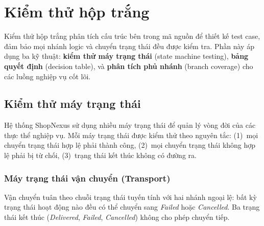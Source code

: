 
\section{Kiểm thử hộp trắng}
\label{sec:whitebox-testing}

Kiểm thử hộp trắng phân tích cấu trúc bên trong mã nguồn để thiết kế test case, đảm bảo mọi nhánh logic và chuyển trạng thái đều được kiểm tra. Phần này áp dụng ba kỹ thuật: \textbf{kiểm thử máy trạng thái} (state machine testing), \textbf{bảng quyết định} (decision table), và \textbf{phân tích phủ nhánh} (branch coverage) cho các luồng nghiệp vụ cốt lõi.

\subsection{Kiểm thử máy trạng thái}
\label{subsec:state-machine-testing}

Hệ thống ShopNexus sử dụng nhiều máy trạng thái để quản lý vòng đời của các thực thể nghiệp vụ. Mỗi máy trạng thái được kiểm thử theo nguyên tắc: (1)~mọi chuyển trạng thái hợp lệ phải thành công, (2)~mọi chuyển trạng thái không hợp lệ phải bị từ chối, (3)~trạng thái kết thúc không có đường ra.

\subsubsection{Máy trạng thái vận chuyển (Transport)}
\label{subsub:sm-transport}

Vận chuyển tuân theo chuỗi trạng thái tuyến tính với hai nhánh ngoại lệ: bất kỳ trạng thái hoạt động nào đều có thể chuyển sang \textit{Failed} hoặc \textit{Cancelled}. Ba trạng thái kết thúc (\textit{Delivered}, \textit{Failed}, \textit{Cancelled}) không cho phép chuyển tiếp.

